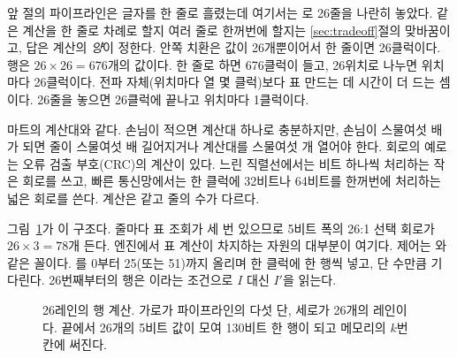 \Why 앞 절의 파이프라인은 글자를 한 줄로 흘렸는데 여기서는 로 26줄을 나란히 놓았다.
같은 계산을 한 줄로 차례로 할지 여러 줄로 한꺼번에 할지는 \ref{sec:tradeoff}절의 맞바꿈이고, 답은 계산의
\emph{양}이 정한다. 안쪽 치환은 값이 26개뿐이어서 한 줄이면 26클럭이다. 행은 $26 \times 26 = 676$개의
값이다. 한 줄로 하면 676클럭이 들고, 26위치로 나누면 위치마다 26클럭이다. 전파 자체(위치마다 열 몇 클럭)보다
표 만드는 데 시간이 더 드는 셈이다. 26줄을 놓으면 26클럭에 끝나고 위치마다 1클럭이다.

\General 마트의 계산대와 같다. 손님이 적으면 계산대 하나로 충분하지만, 손님이 스물여섯 배가 되면 줄이
스물여섯 배 길어지거나 계산대를 스물여섯 개 열어야 한다. 회로의 예로는 오류 검출 부호(CRC)의 계산이 있다.
느린 직렬선에서는 비트 하나씩 처리하는 작은 회로를 쓰고, 빠른 통신망에서는 한 클럭에 32비트나 64비트를
한꺼번에 처리하는 넓은 회로를 쓴다. 계산은 같고 줄의 수가 다르다.

\Ours 그림~\ref{fig:g-e-lanes}가 이 구조다. 줄마다 표 조회가 세 번 있으므로 5비트 폭의 26:1 선택 회로가
$26 \times 3 = 78$개 든다. 엔진에서 표 계산이 차지하는 자원의 대부분이 여기다. 제어는 와 같은
꼴이다. 를 0부터 25(또는 51)까지 올리며 한 클럭에 한 행씩 넣고, 단 수만큼 기다린다.
26번째부터의 행은 이라는 조건으로 $I$ 대신 $I'$을 읽는다.

\begin{figure}[ht]
\centering
{}
\caption{26레인의 행 계산. 가로가 파이프라인의 다섯 단, 세로가 26개의 레인이다. 끝에서 26개의 5비트 값이
모여 130비트 한 행이 되고 메모리의 $k$번 칸에 써진다.}
\label{fig:g-e-lanes}
\end{figure}

